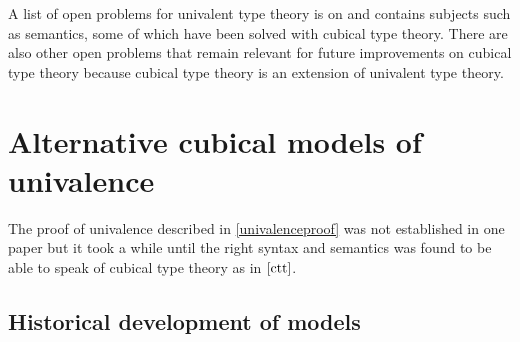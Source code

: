 \documentclass[12pt,a4paper,twoside,xetex]{book}
\begin{document}
\begin{itemize}


\end{itemize}

A list of open problems for univalent type theory is on \cite{Awodey2019} and 
contains subjects such as semantics, some of which have been solved with cubical 
type theory. There are also other open problems that remain relevant for future 
improvements on cubical type theory because cubical type theory is an extension 
of univalent type theory.



\section{Alternative cubical models of univalence}

The proof of univalence described in \cref{univalenceproof} was not established in one paper but it took a while until the right syntax and semantics was found to be able to speak of cubical type theory as in $\cref{ctt}$.

\subsection{Historical development of models}\label{nominalmod}
\end{document}
